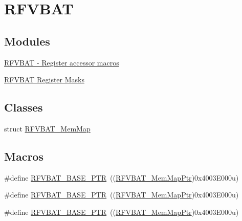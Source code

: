 \hypertarget{group___r_f_v_b_a_t___peripheral}{}\section{R\+F\+V\+B\+AT}
\label{group___r_f_v_b_a_t___peripheral}
\subsection*{Modules}
\begin{DoxyCompactItemize}
\item 
\hyperlink{group___r_f_v_b_a_t___register___accessor___macros}{R\+F\+V\+B\+A\+T -\/ Register accessor macros}
\item 
\hyperlink{group___r_f_v_b_a_t___register___masks}{R\+F\+V\+B\+A\+T Register Masks}
\end{DoxyCompactItemize}
\subsection*{Classes}
\begin{DoxyCompactItemize}
\item 
struct \hyperlink{struct_r_f_v_b_a_t___mem_map}{R\+F\+V\+B\+A\+T\+\_\+\+Mem\+Map}
\end{DoxyCompactItemize}
\subsection*{Macros}
\begin{DoxyCompactItemize}
\item 
\#define \hyperlink{group___r_f_v_b_a_t___peripheral_ga5b6418d9be20f84b2190ccf6134b7ba3}{R\+F\+V\+B\+A\+T\+\_\+\+B\+A\+S\+E\+\_\+\+P\+TR}~((\hyperlink{group___r_f_v_b_a_t___peripheral_gaf818ad4cab94790b0374758504777f4f}{R\+F\+V\+B\+A\+T\+\_\+\+Mem\+Map\+Ptr})0x4003\+E000u)
\item 
\#define \hyperlink{group___r_f_v_b_a_t___peripheral_ga5b6418d9be20f84b2190ccf6134b7ba3}{R\+F\+V\+B\+A\+T\+\_\+\+B\+A\+S\+E\+\_\+\+P\+TR}~((\hyperlink{group___r_f_v_b_a_t___peripheral_gaf818ad4cab94790b0374758504777f4f}{R\+F\+V\+B\+A\+T\+\_\+\+Mem\+Map\+Ptr})0x4003\+E000u)
\item 
\#define \hyperlink{group___r_f_v_b_a_t___peripheral_ga5b6418d9be20f84b2190ccf6134b7ba3}{R\+F\+V\+B\+A\+T\+\_\+\+B\+A\+S\+E\+\_\+\+P\+TR}~((\hyperlink{group___r_f_v_b_a_t___peripheral_gaf818ad4cab94790b0374758504777f4f}{R\+F\+V\+B\+A\+T\+\_\+\+Mem\+Map\+Ptr})0x4003\+E000u)
\end{DoxyCompactItemize}
